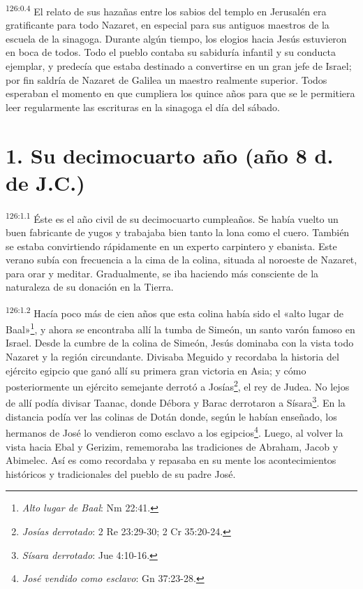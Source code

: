 \par 
\textsuperscript{126:0.4} El relato de sus hazañas entre los sabios del templo en Jerusalén era gratificante para todo Nazaret, en especial para sus antiguos maestros de la escuela de la sinagoga. Durante algún tiempo, los elogios hacia Jesús estuvieron en boca de todos. Todo el pueblo contaba su sabiduría infantil y su conducta ejemplar, y predecía que estaba destinado a convertirse en un gran jefe de Israel; por fin saldría de Nazaret de Galilea un maestro realmente superior. Todos esperaban el momento en que cumpliera los quince años para que se le permitiera leer regularmente las escrituras en la sinagoga el día del sábado.

\section*{1. Su decimocuarto año (año 8 d. de J.C.)}
\par 
\textsuperscript{126:1.1} Éste es el año civil de su decimocuarto cumpleaños. Se había vuelto un buen fabricante de yugos y trabajaba bien tanto la lona como el cuero. También se estaba convirtiendo rápidamente en un experto carpintero y ebanista. Este verano subía con frecuencia a la cima de la colina, situada al noroeste de Nazaret, para orar y meditar. Gradualmente, se iba haciendo más consciente de la naturaleza de su donación en la Tierra.

\par 
\textsuperscript{126:1.2} Hacía poco más de cien años que esta colina había sido el «alto lugar de Baal»\footnote{\textit{Alto lugar de Baal}: Nm 22:41.}, y ahora se encontraba allí la tumba de Simeón, un santo varón famoso en Israel. Desde la cumbre de la colina de Simeón, Jesús dominaba con la vista todo Nazaret y la región circundante. Divisaba Meguido y recordaba la historia del ejército egipcio que ganó allí su primera gran victoria en Asia; y cómo posteriormente un ejército semejante derrotó a Josías\footnote{\textit{Josías derrotado}: 2 Re 23:29-30; 2 Cr 35:20-24.}, el rey de Judea. No lejos de allí podía divisar Taanac, donde Débora y Barac derrotaron a Sísara\footnote{\textit{Sísara derrotado}: Jue 4:10-16.}. En la distancia podía ver las colinas de Dotán donde, según le habían enseñado, los hermanos de José lo vendieron como esclavo a los egipcios\footnote{\textit{José vendido como esclavo}: Gn 37:23-28.}. Luego, al volver la vista hacia Ebal y Gerizim, rememoraba las tradiciones de Abraham, Jacob y Abimelec. Así es como recordaba y repasaba en su mente los acontecimientos históricos y tradicionales del pueblo de su padre José.

